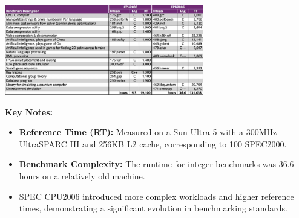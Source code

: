 \begin{center}
    \includegraphics[width=0.65\textwidth]{chapters/chapter4a/images/spec.png}
\end{center}

\textbf{Key Notes:}
\begin{itemize}
    \item \textbf{Reference Time (RT):} Measured on a Sun Ultra 5 with a 300MHz UltraSPARC III and 256KB L2 cache, corresponding to 100 SPEC2000.
    \item \textbf{Benchmark Complexity:} The runtime for integer benchmarks was 36.6 hours on a relatively old machine.
    \item SPEC CPU2006 introduced more complex workloads and higher reference times, demonstrating a significant evolution in benchmarking standards.
\end{itemize}
